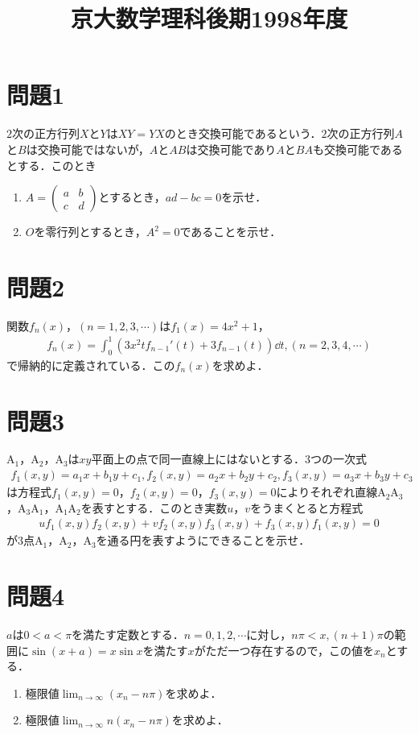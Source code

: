 \documentclass[unicode,12pt, A4j]{ltjsarticle}%
\title{京大数学理科後期1998年度}
\author{}
\date{}
\begin{document}
\maketitle

\section{問題1}
$2$次の正方行列$X$と$Y$は$XY=YX$のとき交換可能であるという．$2$次の正方行列$A$と$B$は交換可能ではないが，$A$と$AB$は交換可能であり$A$と$BA$も交換可能であるとする．このとき
\begin{enumerate}
 \item $A=\begin{pmatrix} a&b\\ c&d \end{pmatrix}$とするとき，$ad-bc=0$を示せ．
 \item $O$を零行列とするとき，$A^2=0$であることを示せ．
\end{enumerate}


\section{問題2}
関数$f_n(x)$，$(n=1,2,3,\cdots)$は$f_1(x)=4x^2+1$，
\begin{align*}
 f_n(x)=\int_{0}^{1}\left(3x^2tf_{n-1}'(t)+3f_{n-1}(t)\right)\dd t, (n=2,3,4,\cdots)
\end{align*}
で帰納的に定義されている．この$f_n(x)$を求めよ．

\section{問題3}
$\mathrm{A}_1$，$\mathrm{A}_2$，$\mathrm{A}_3$は$xy$平面上の点で同一直線上にはないとする．$3$つの一次式
\begin{align*}
 f_1(x,y)=a_1x+b_1y+c_1, f_2(x,y)=a_2x+b_2y+c_2, f_3(x,y)=a_3x+b_3y+c_3
\end{align*}
は方程式$f_1(x,y)=0$，$f_2(x,y)=0$，$f_3(x,y)=0$によりそれぞれ直線$\mathrm{A_2A_3}$，$\mathrm{A_3A_1}$，$\mathrm{A_1A_2}$を表すとする．このとき実数$u$，$v$をうまくとると方程式
\begin{align*}
 uf_1(x,y)f_2(x,y)+vf_2(x,y)f_3(x,y)+f_3(x,y)f_1(x,y)=0
\end{align*}
が$3$点$\mathrm{A}_1$，$\mathrm{A}_2$，$\mathrm{A}_3$を通る円を表すようにできることを示せ．

\section{問題4}
$a$は$0<a<\pi$を満たす定数とする．$n=0,1,2,\cdots$に対し，$n\pi < x, (n+1)\pi$の範囲に$\sin(x+a)=x\sin x$を満たす$x$がただ一つ存在するので，この値を$x_n$とする．
\begin{enumerate}
 \item 極限値${\displaystyle \lim_{n\to\infty}(x_n-n\pi)}$を求めよ．
 \item 極限値${\displaystyle \lim_{n\to\infty}n(x_n-n\pi)}$を求めよ．
\end{enumerate}
\end{document}
